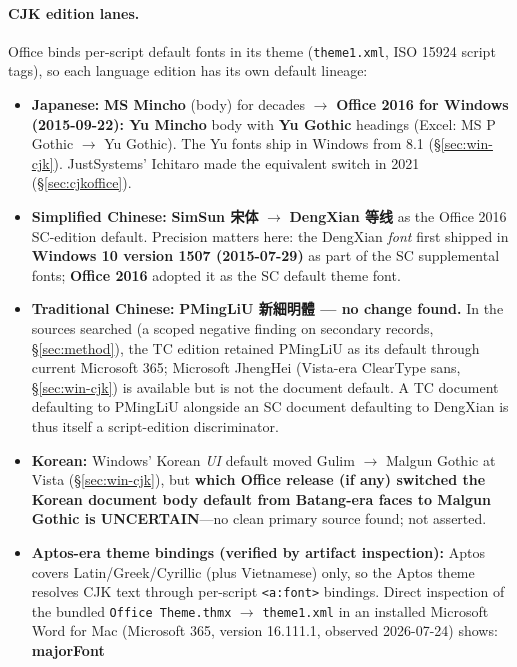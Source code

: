 \documentclass[10pt,a4paper]{article}
\newcommand{\code}[1]{\texttt{#1}}
\begin{document}
\paragraph{CJK edition lanes.} Office binds per-script default fonts in its theme
(\code{theme1.xml}, ISO 15924 script tags), so each language edition has its own
default lineage:
\begin{itemize}[leftmargin=1.2em,itemsep=2pt]
\item \textbf{Japanese:} \textbf{MS Mincho} (body) for decades $\rightarrow$
\textbf{Office 2016 for Windows (2015-09-22): Yu Mincho} body with \textbf{Yu Gothic}
headings (Excel: MS P Gothic $\rightarrow$ Yu Gothic). The Yu fonts ship in Windows
from 8.1 (\S\ref{sec:win-cjk}). JustSystems' Ichitaro made the equivalent switch in
2021 (\S\ref{sec:cjkoffice}).\cite{o-jp}
\item \textbf{Simplified Chinese:} \textbf{SimSun 宋体} $\rightarrow$ \textbf{DengXian
等线} as the Office 2016 SC-edition default. Precision matters here: the DengXian
\emph{font} first shipped in \textbf{Windows 10 version 1507 (2015-07-29)} as part of
the SC supplemental fonts; \textbf{Office 2016} adopted it as the SC default theme
font.\cite{o-dengxian}
\item \textbf{Traditional Chinese:} \textbf{PMingLiU 新細明體 --- no change found.} In
the sources searched (a scoped negative finding on secondary records,
\S\ref{sec:method}), the TC edition retained PMingLiU as its default through current
Microsoft 365; Microsoft JhengHei
(Vista-era ClearType sans, \S\ref{sec:win-cjk}) is available but is not the document
default. A TC document defaulting to PMingLiU alongside an SC document defaulting to
DengXian is thus itself a script-edition discriminator.\cite{o-tc}
\item \textbf{Korean:} Windows' Korean \emph{UI} default moved Gulim $\rightarrow$
Malgun Gothic at Vista (\S\ref{sec:win-cjk}), but \textbf{which Office release (if any)
switched the Korean document body default from Batang-era faces to Malgun Gothic is
UNCERTAIN}---no clean primary source found; not asserted.\cite{o-kr}
\item \textbf{Aptos-era theme bindings (verified by artifact inspection):} Aptos covers
Latin/Greek/Cyrillic (plus Vietnamese) only, so the Aptos theme resolves CJK text
through per-script \code{<a:font>} bindings. Direct inspection of the bundled
\code{Office Theme.thmx} $\rightarrow$ \code{theme1.xml} in an installed Microsoft Word
for Mac (Microsoft 365, version 16.111.1, observed 2026-07-24) shows: \textbf{majorFont}

\end{itemize}
\end{document}
